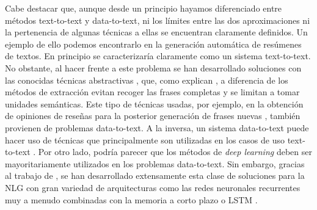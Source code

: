 Cabe destacar que, aunque desde un principio hayamos diferenciado entre métodos text-to-text y data-to-text, ni los límites entre las dos aproximaciones ni la pertenencia de algunas técnicas a ellas se encuentran claramente definidos. Un ejemplo de ello podemos encontrarlo en la generación automática de resúmenes de textos. En principio se caracterizaría claramente como un sistema text-to-text. No obstante, al hacer frente a este problema se han desarrollado soluciones con las conocidas técnicas abstractivas \citep{genest2011framework}, que, como explican \cite{hahn2000challenges}, a diferencia de los métodos de extracción evitan recoger las frases completas y se limitan a tomar unidades semánticas. Este tipo de técnicas usadas, por ejemplo, en la obtención de opiniones de reseñas para la posterior generación de frases nuevas \citep{labbe2012towards}, también provienen de problemas data-to-text. A la inversa, un sistema data-to-text puede hacer uso de técnicas que principalmente son utilizadas en los casos de uso text-to-text \citep{mcintyre2009learning, kondadadi2013statistical}. Por otro lado, podría parecer que los métodos de \textit{deep learning} \citep{goodfellow2016deep} deben ser mayoritariamente utilizados en los problemas data-to-text. Sin embargo, gracias al trabajo de \cite{mikolov2013efficient}, se han desarrollado extensamente esta clase de soluciones para la NLG con gran variedad de arquitecturas como las redes neuronales recurrentes \citep{cho2014learning, tang2016context} muy a menudo combinadas con la memoria a corto plazo o LSTM \citep{chen2016enhanced}.